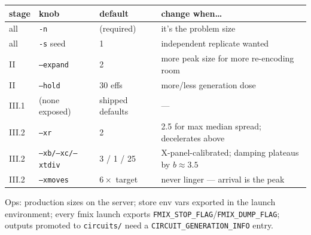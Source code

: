\documentclass[11pt]{article}
\newcommand{\doc}[1]{\texttt{#1}}
\begin{document}
\begin{table}[H]\small
\begin{tabular}{llL{2.6cm}L{6.6cm}}
\toprule
stage & knob & default & change when\ldots \\
\midrule
all & \texttt{-n} & (required) & it's the problem size \\
all & \texttt{-s} seed & 1 & independent replicate wanted \\
II & \texttt{--expand} & 2 & more peak size for more re-encoding room \\
II & \texttt{--hold} & 30 effs & more/less generation dose \\
III.1 & (none exposed) & shipped defaults & --- \\
III.2 & \texttt{--xr} & 2 & 2.5 for max median spread; decelerates above \\
III.2 & \texttt{--xb/--xc/--xtdiv} & 3 / 1 / 25 & X-panel-calibrated; damping plateaus by $b\approx3.5$ \\
III.2 & \texttt{--xmoves} & $6\times$ target & never linger --- arrival is the peak \\
\bottomrule
\end{tabular}
\end{table}

Ops: production sizes on the server; store env vars exported in the launch
environment; every fmix launch exports
\texttt{FMIX\_STOP\_FLAG}/\texttt{FMIX\_DUMP\_FLAG}; outputs promoted to
\doc{circuits/} need a \doc{CIRCUIT\_GENERATION\_INFO} entry.
\end{document}
